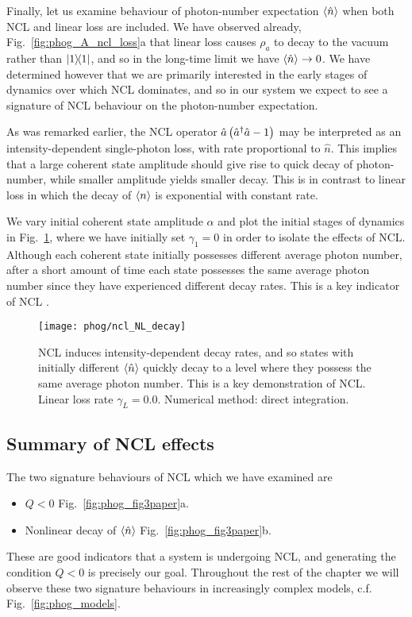 Finally, let us examine behaviour of photon-number expectation $\ev{\hat{n}}$ when both NCL and linear loss are included. We have observed already, Fig.~\ref{fig:phog_A_ncl_loss}a that linear loss causes $\rho_a$ to decay to the vacuum rather than $\dyad{1}$, and so in the long-time limit we have $\ev{\hat{n}} \rightarrow 0$. We have determined however that we are primarily interested in the early stages of dynamics over which NCL dominates, and so in our system we expect to see a signature of NCL behaviour on the photon-number expectation.

As was remarked earlier, the NCL operator $\hat{a}\left(\hat{a}^\dagger \hat{a} - 1\right)$ may be interpreted as an intensity-dependent single-photon loss, with rate proportional to $\hat{n}$. This implies that a large coherent state amplitude should give rise to quick decay of photon-number, while smaller amplitude yields smaller decay. This is in contrast to linear loss in which the decay of $\ev{n}$ is exponential with constant rate.

We vary initial coherent state amplitude $\alpha$ and plot the initial stages of dynamics in Fig.~\ref{fig:phog_ncl_NL_decay}, where we have initially set $\gamma_1=0$ in order to isolate the effects of NCL. Although each coherent state initially possesses different average photon number, after a short amount of time each state possesses the same average photon number since they have experienced different decay rates. This is a key indicator of NCL \cite{Mogilevtsev2010, Shchesnovich2011}.

\begin{figure}[htp]
\centering
\texttt{[image: phog/ncl\_NL\_decay]}
\caption{\label{fig:phog_ncl_NL_decay} NCL induces intensity-dependent decay rates, and so states with initially different $\ev{\hat{n}}$ quickly decay to a level where they possess the same average photon number. This is a key demonstration of NCL. Linear loss rate $\gamma_L = 0.0$. Numerical method: direct integration.}
\end{figure}


\subsection{Summary of NCL effects}\label{sec:phog_summary_ncl_effects}
The two signature behaviours of NCL which we have examined are
\begin{itemize}
\item $Q < 0$ Fig.~\ref{fig:phog_fig3paper}a.
\item Nonlinear decay of $\ev{\hat{n}}$ Fig.~\ref{fig:phog_fig3paper}b.
\end{itemize}
These are good indicators that a system is undergoing NCL, and generating the condition $Q<0$ is precisely our goal. Throughout the rest of the chapter we will observe these two signature behaviours in increasingly complex models, c.f. Fig.~\ref{fig:phog_models}.

